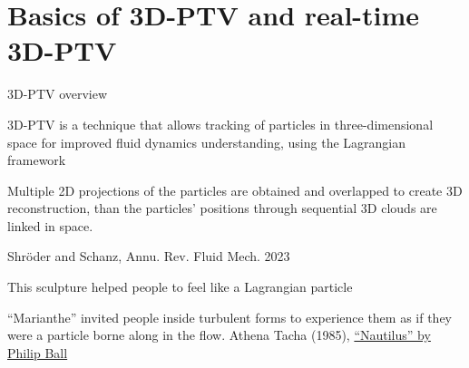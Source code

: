 \section{Basics of 3D-PTV and real-time 3D-PTV}


    

\begin{frame}[label=ptv-1]{3D-PTV overview}
    \begin{multicols}{2}
    \begin{card}
    3D-PTV is a technique that allows tracking of particles in three-dimensional space for improved fluid dynamics understanding, using the Lagrangian framework
    \end{card}
    \begin{card}[TL;DR]
    Multiple 2D projections of the particles are obtained and overlapped to create 3D reconstruction, than the particles' positions through sequential 3D clouds are linked in space. 
    \end{card}
    \end{multicols}
\end{frame}


%
\begin{frame}[label=ptv-2]{Shr\"{o}der and Schanz, Annu. Rev. Fluid Mech. 2023}
\end{frame}

\begin{frame}[label=ptv-3]{This sculpture helped people to feel like a Lagrangian particle}
    \centering{}
    \vspace{-.3cm}
    \begin{cardTiny}
    ``Marianthe'' invited people inside turbulent forms to experience them as
    if they were a particle borne along in the flow. Athena
    Tacha (1985), \href{http://nautil.us/issue/15/turbulence/the-scientific-problem-that-must-be-experienced}{``Nautilus'' by Philip Ball}
    \end{cardTiny}                                                          
\end{frame}
%

